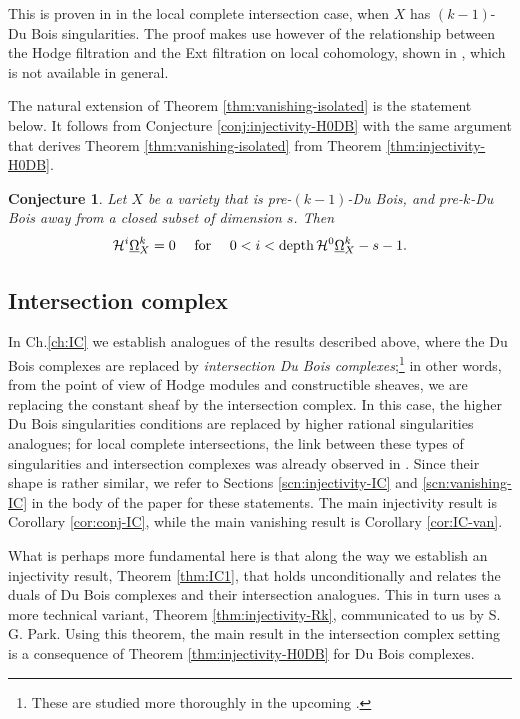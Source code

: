 \documentclass[11pt]{amsart}
\theoremstyle{definition}
\theoremstyle{plain}
\renewcommand{\H}{\mathcal H}
\newcommand{\DB}{\underline{\Omega}} %
\DeclareMathOperator{\depth}{depth}
\newcounter{intro}
\newtheorem{intro-conjecture}[intro]{Conjecture}
\begin{document}
This is proven in \cite{MP-lci} in the local complete intersection case, when $X$ has $(k-1)$-Du Bois singularities. The proof makes use however of the relationship
between the Hodge filtration and the Ext filtration on local cohomology, shown in \cite{MP-LC}, which is not available in general.

The natural extension of Theorem \ref{thm:vanishing-isolated} is the statement below. It follows from Conjecture \ref{conj:injectivity-H0DB}
with the same argument that derives Theorem \ref{thm:vanishing-isolated} from Theorem \ref{thm:injectivity-H0DB}.

\begin{intro-conjecture}\label{conj:vanishing-general}
 Let $X$ be a variety that is pre-$(k-1)$-Du Bois, and pre-$k$-Du Bois away from a closed subset of dimension $s$. Then
 \[\H^i\DB^k_X = 0 \quad \text{ {\rm for} } \quad 0<i<\depth\H^0\DB^k_X- s -1.\] 
\end{intro-conjecture}

\subsection*{Intersection complex}
In Ch.\ref{ch:IC} we establish analogues of the results described above, where the Du Bois complexes are replaced by \emph{intersection 
Du Bois complexes};\footnote{These are studied more thoroughly in the upcoming \cite{PP}.} in other words, from the point of view of Hodge modules and constructible sheaves, we are replacing the constant sheaf by the intersection complex. In this case, the higher Du Bois singularities conditions are replaced by higher rational singularities analogues; for local complete intersections, the link between these types of singularities and intersection complexes was already observed in \cite{CDM}.  Since their shape is rather similar, we refer to Sections \ref{scn:injectivity-IC} and \ref{scn:vanishing-IC} in the body of the paper for these statements.  The main injectivity result is Corollary \ref{cor:conj-IC}, while the main vanishing result is Corollary \ref{cor:IC-van}.

What is perhaps more fundamental here is that along the way we establish an injectivity result, Theorem \ref{thm:IC1}, that holds unconditionally and relates the duals of Du Bois complexes and their intersection analogues. This in turn uses a more technical variant, Theorem \ref{thm:injectivity-Rk}, communicated to us by S. G. Park.  Using this theorem, the main result in the intersection complex setting is a consequence of Theorem \ref{thm:injectivity-H0DB} for Du Bois complexes.
\end{document}
